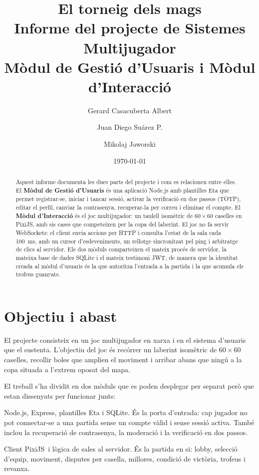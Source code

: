 \documentclass[11pt,a4paper]{article}
\title{\textbf{El torneig dels mags}\\[0.4em]
\large Informe del projecte de Sistemes Multijugador\\[0.3em]
\normalsize Mòdul de Gestió d'Usuaris i Mòdul d'Interacció}
\author{Gerard Casacuberta Albert \and Juan Diego Suárez P. \and Mikolaj Jaworski}
\date{\today}
\begin{document}
\maketitle

\begin{abstract}
\noindent
Aquest informe documenta les dues parts del projecte i com es relacionen entre elles.
El \textbf{Mòdul de Gestió d'Usuaris} és una aplicació Node.js amb plantilles Eta que
permet registrar-se, iniciar i tancar sessió, activar la verificació en dos passos
(TOTP), editar el perfil, canviar la contrasenya, recuperar-la per correu i eliminar
el compte. El \textbf{Mòdul d'Interacció} és el joc multijugador: un taulell isomètric
de $60 \times 60$ caselles en PixiJS, amb sis cases que competeixen per la copa del
laberint. El joc no fa servir WebSockets: el client envia accions per HTTP i consulta
l'estat de la sala cada 100~ms, amb un cursor d'esdeveniments, un rellotge sincronitzat
pel ping i arbitratge de clics al servidor. Els dos mòduls comparteixen el mateix procés
de servidor, la mateixa base de dades SQLite i el mateix testimoni JWT, de manera que la
identitat creada al mòdul d'usuaris és la que autoritza l'entrada a la partida i la que
acumula els trofeus guanyats.
\end{abstract}

\tableofcontents
\newpage

\section{Objectiu i abast}
\label{sec:objectiu}

El projecte consisteix en un joc multijugador en xarxa i en el sistema d'usuaris que el
sustenta. L'objectiu del joc és recórrer un laberint isomètric de $60 \times 60$ caselles,
recollir boles que amplien el moviment i arribar abans que ningú a la copa situada a
l'extrem oposat del mapa.

El treball s'ha dividit en dos mòduls que es poden desplegar per separat però que estan
dissenyats per funcionar junts:

\begin{description}[leftmargin=1.2cm,style=nextline]
  \item[Mòdul de Gestió d'Usuaris] Node.js, Express, plantilles Eta i SQLite.
        És la porta d'entrada: cap jugador no pot connectar-se a una partida sense un
        compte vàlid i sense sessió activa. També inclou la recuperació de contrasenya,
        la moderació i la verificació en dos passos.
  \item[Mòdul d'Interacció] Client PixiJS\ i lògica de sales al servidor.
        És la partida en si: lobby, selecció d'equip, moviment, disputes per casella,
        millores, condició de victòria, trofeus i revanxa.
\end{description}
\end{document}
